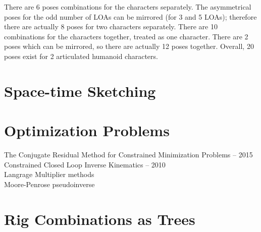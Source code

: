 There are 6 poses combinations for the characters separately. The asymmetrical poses for the odd number of LOAs can be mirrored (for 3 and 5 LOAs); therefore there are actually 8 poses for two characters separately. There are 10 combinations for the characters together, treated as one character. There are 2 poses which can be mirrored, so there are actually 12 poses together. Overall, 20 poses exist for 2 articulated humanoid characters.

\section{Space-time Sketching}


\section{Optimization Problems}
The Conjugate Residual Method for Constrained Minimization Problems -- 2015\\
Constrained Closed Loop Inverse Kinematics -- 2010 \\
Langrage Multiplier methods \\
Moore-Penrose pseudoinverse \\

\section{Rig Combinations as Trees}
